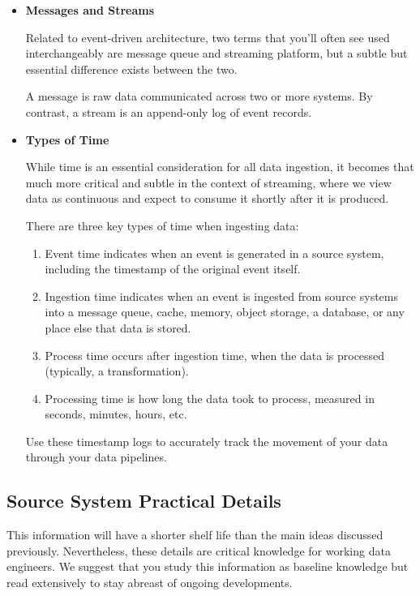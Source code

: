 \begin{itemize}
    \item \textbf{Messages and Streams}
    
    \noindent
    Related to event-driven architecture, two terms that
    you'll often see used interchangeably are message
    queue and streaming platform, but a subtle but
    essential difference exists between the two.

    A message is raw data communicated across two or more systems.
    By contrast, a stream is an append-only log of event records.

    \item \textbf{Types of Time}
    
    \noindent

    While time is an essential consideration for all data
    ingestion, it becomes that much more critical and subtle
    in the context of streaming, where we view data as continuous
    and expect to consume it shortly after it is produced.
    
    There are three key types of time when ingesting data:
    \begin{enumerate}
        \item Event time indicates when an event is generated
        in a source system, including the timestamp of the
        original event itself.

        \item Ingestion time indicates when an event
        is ingested from source systems into a message queue,
        cache, memory, object storage, a database, or any place
        else that data is stored.

        \item Process time occurs after ingestion time, when
        the data is processed (typically, a transformation).

        \item Processing time is how long the data took to
        process, measured in seconds, minutes, hours, etc.
    \end{enumerate}
    Use these timestamp logs to accurately track the movement of
    your data through your data pipelines.
\end{itemize}



\subsection{Source System Practical Details}
This information will have a shorter shelf life than the main
ideas discussed previously. Nevertheless, these details are
critical knowledge for working data engineers. We suggest that
you study this information as baseline knowledge but read
extensively to stay abreast of ongoing developments.


